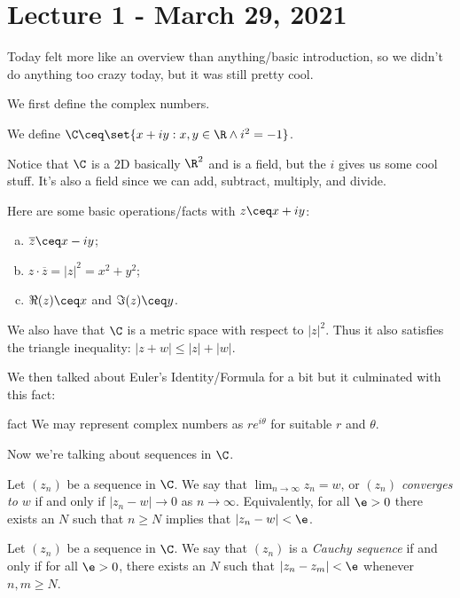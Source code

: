 \documentclass[class=article, crop=false]{standalone}
\begin{document}
\section{Lecture 1 - March 29, 2021}

Today felt more like an overview than anything/basic introduction, so we didn't do anything too crazy today, but it was still pretty cool.

We first define the complex numbers.

\begin{defn}
  We define $\C\ceq \set{x+iy : x,y \in \R \land i^2 = -1}$.
\end{defn}
Notice that $\C$ is a $2$D basically $\R^2$ and is a field, but the $i$ gives us some cool stuff. It's also a field since we can add, subtract, multiply, and divide.

Here are some basic operations/facts with $z \ceq x+iy$:
  \begin{enumerate}[(a)]
    \item $\overline z \ceq x-iy$;
    \item $z\cdot \overline z=|z|^2=x^2+y^2$;
    \item $\Re(z) \ceq x$ and $\Im(z) \ceq y$.
  \end{enumerate}


We also have that $\C$ is a metric space with respect to $|z|^2$. Thus it also satisfies the triangle inequality: $|z+w| \leq |z|+|w|$.

We then talked about Euler's Identity/Formula for a bit but it culminated with this fact:
\begin{result}{fact}
  We may represent complex numbers as $r e^{i\theta}$ for suitable $r$ and $\theta$.
\end{result}

Now we're talking about sequences in $\C$.

\begin{defn}
  Let $(z_n)$ be a sequence in $\C$. We say that $\lim_{n \to \infty} z_n =w $, or \emph{$(z_n)$ converges to $w$} if and only if $|z_n-w| \to 0$ as $n \to \infty$. Equivalently, for all $\e > 0$ there exists an $N$ such that $n \geq N$ implies that $|z_n -w | < \e$.
\end{defn}

\begin{defn}
  Let $(z_n)$ be a sequence in $\C$. We say that $(z_n)$ is a \emph{Cauchy sequence} if and only if for all $\e > 0$, there exists an $N$ such that $|z_n-z_m| < \e$ whenever $n,m \geq N$.
\end{defn}
\end{document}

